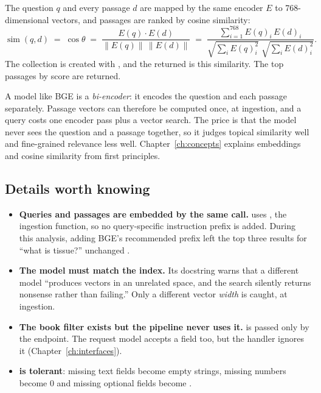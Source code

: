 The question $q$ and every passage $d$ are mapped by the same encoder $E$ to 768-dimensional vectors, and passages are ranked by cosine similarity:
\begin{equation}
\operatorname{sim}(q,d) \;=\; \cos\theta \;=\; \frac{E(q)\cdot E(d)}{\lVert E(q)\rVert\,\lVert E(d)\rVert} \;=\; \frac{\sum_{i=1}^{768} E(q)_i\,E(d)_i}{\sqrt{\sum_i E(q)_i^2}\;\sqrt{\sum_i E(d)_i^2}}.
\end{equation}
The collection is created with  , and the returned  is this similarity. The top  passages by score are returned.

\begin{background}[bi-encoders]
A model like BGE is a \emph{bi-encoder}: it encodes the question and each passage separately. Passage vectors can therefore be computed once, at ingestion, and a query costs one encoder pass plus a vector search. The price is that the model never sees the question and a passage together, so it judges topical similarity well and fine-grained relevance less well. Chapter~\ref{ch:concepts} explains embeddings and cosine similarity from first principles.
\end{background}

\subsection{Details worth knowing}

\begin{itemize}
  \item \textbf{Queries and passages are embedded by the same call.}  uses , the ingestion function, so no query-specific instruction prefix is added. During this analysis, adding BGE's recommended prefix left the top three results for \enquote{what is tissue?} unchanged \tagM.
  \item \textbf{The model must match the index.} Its docstring warns that a different model \enquote{produces vectors in an unrelated space, and the search silently returns nonsense rather than failing.} Only a different vector \emph{width} is caught, at ingestion.
  \item \textbf{The book filter exists but the pipeline never uses it.}  is passed only by the  endpoint. The  request model accepts a  field too, but the handler ignores it (Chapter~\ref{ch:interfaces}).
  \item \textbf{ is tolerant}: missing text fields become empty strings, missing numbers become 0 and missing optional fields become  .
\end{itemize}

